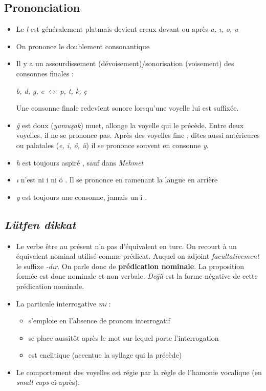 \documentclass{cours}
\newcommand{\ch}{\c{s}}
\newcommand{\ug}{\u{g}}
\begin{document}
\subsection{Prononciation}
\begin{itemize}
    \item Le \textsl{l} est généralement \og plat\fg mais devient \og creux \fg devant ou après \textsl{a, \i, o, u}
    \item On prononce le doublement consonantique
    \item Il y a un assourdissement (dévoisement)/sonorisation (voisement) des consonnes finales :
          \begin{center}
              \textsl{b, d, g, c} $\leftrightarrow$ \textsl{p, t, k, ç}
          \end{center}
          Une consonne finale redevient sonore lorsqu'une voyelle lui est suffixée.
    \item \textsl{\ug} est \og doux \fg (\textsl{yumu\ch ak}) muet, allonge la voyelle qui le précède. Entre deux voyelles, il ne se prononce pas. Après des voyelles \og fine \fg, dites aussi antérieures ou palatales (\textsl{e, i, ö, ü}) il se prononce souvent en consonne \textsl{y}.
    \item \textsl{h} est toujours \og aspiré \fg, sauf dans \textsl{Mehmet}
    \item \textsl{\i} n'est ni \og i \fg ni \og ö \fg. Il se prononce en ramenant la langue en arrière
    \item \textsl{y} est toujours une consonne, jamais un \og i \fg.
\end{itemize}

\subsection{\textsl{Lütfen dikkat}}
\begin{itemize}
    \item Le verbe \og être \fg au présent n'a pas d'équivalent en turc. On recourt à un équivalent nominal utilisé comme prédicat. Auquel on adjoint \emph{facultativement} le suffixe \textsl{-d\i r}. On parle donc de {\bf prédication nominale}. La proposition formée est donc nominale et non verbale. \textsl{De\ug il} est la forme négative de cette prédication nominale.
    \item La particule interrogative \textsl{m\textsc{i}} :
          \begin{itemize}
              \item s'emploie en l'absence de pronom interrogatif
              \item se place aussitôt après le mot sur lequel porte l'interrogation
              \item est enclitique (accentue la syllage qui la précède)
          \end{itemize}
    \item Le comportement des voyelles est régie par la règle de l'hamonie vocalique (en \textsl{small caps} ci-après).
\end{itemize}
\end{document}
